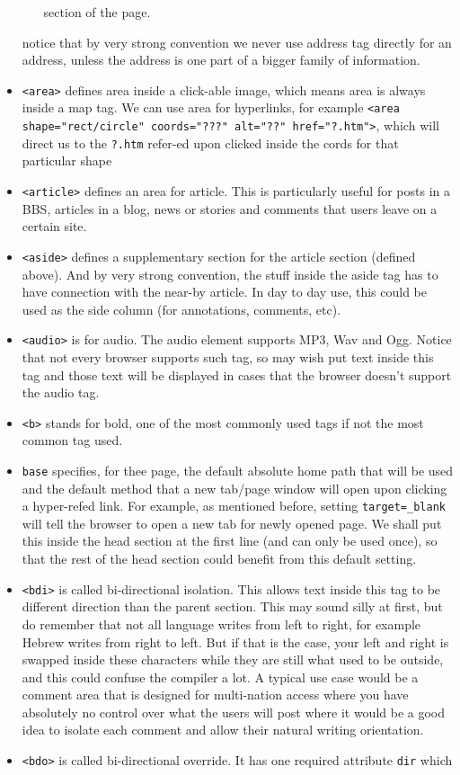 \documentclass[oneside, 12pt]{article}
\newcommand{\itemm}[1]{\item \texttt{#1}}
\begin{document}
\begin{itemize}
\begin{enumerate}
			section of the page.
		\end{enumerate}
		notice that by very strong convention we never use address tag directly for an address, unless 
		the address is one part of a bigger family of information.
	\itemm{<area>} defines area inside a click-able image, which means area is always inside a map tag.
	We can use area for hyperlinks, for example \texttt{<area shape="rect/circle" coords="???" alt="??" href="?.htm">}, 
	which will direct us to the \texttt{?.htm} refer-ed upon clicked inside the cords for that particular shape
	\itemm{<article>} defines an area for article. This is particularly useful for posts in a BBS, articles
	in a blog, news or stories and comments that users leave on a certain site.
	\itemm{<aside>} defines a supplementary section for the article section (defined above). And
	by very strong convention, the stuff inside the aside tag has to have connection with the near-by
	article. In day to day use, this could be used as the side column (for annotations, comments, etc).
	\itemm{<audio>} is for audio. The audio element supports MP3, Wav and Ogg. Notice that not every browser
	supports such tag, so may wish put text inside this tag and those text will be displayed in cases that
	the browser doesn't support the audio tag.
	\itemm{<b>} stands for bold, one of the most commonly used tags if not the most common tag used.
	\itemm{base} specifies, for thee page, the default absolute home path that will be used and the
	default method that a new tab/page window will open upon clicking a hyper-refed link. For example,
	as mentioned before, setting \texttt{target=\_blank} will tell the browser to open a new tab for
	newly opened page. We shall put this inside the head section at the first line (and can only be
	used once), so that the rest of the head section could benefit from this default setting.
	\itemm{<bdi>} is called bi-directional isolation. This allows text inside this tag to be different
	direction than the parent section. This may sound silly at first, but do remember that not all language
	writes from left to right, for example Hebrew writes from right to left. But if that is the case,
	your left and right is swapped inside these characters while they are still what used to be outside, and
	this could confuse the compiler a lot. A typical use case would be a comment area that is designed
	for multi-nation access where you have absolutely no control over what the users will post where it
	would be a good idea to isolate each comment and allow their natural writing orientation. 
	\itemm{<bdo>} is called bi-directional override. It has one required attribute \texttt{dir} which

\end{itemize}
\end{document}
